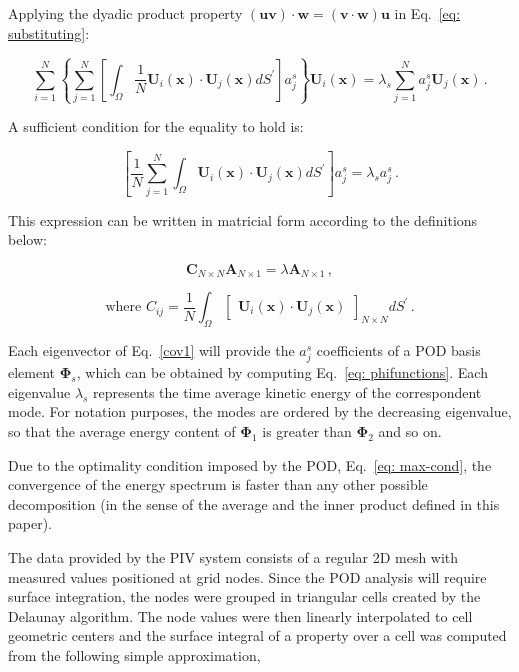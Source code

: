 \documentclass[12pt,a4paper]{article}
\newcommand{\bv}[1]{\mathbf{#1}}
\begin{document}
Applying the dyadic product property $(\mathbf{u} \mathbf{v}) \cdot \mathbf{w} =  (\mathbf{v} \cdot \mathbf{w}) \mathbf{u}$ in Eq.~\eqref{eq: substituting}:


\begin{equation*}
\sum_{i=1}^{N} \left \lbrace \sum_{j=1}^{N} \left[\int_{\Omega} \frac{1}{N} \bv{U}_i(\bv{x}) \cdot \bv{U}_{j} (\bv{x}) dS^{\prime}  \right] a^{s}_{j} \right \rbrace \bv{U}_i(\bv{x}) = \lambda_{s} \sum_{j=1}^{N} a^{s}_{j} \bv{U}_{j} (\bv{x}) \,.
\end{equation*}


A sufficient condition for the equality to hold is:


\begin{equation}
\left[\frac{1}{N} \sum_{j=1}^{N} \int_{\Omega} \bv{U}_{i}(\bv{x}) \cdot \bv{U}_{j}(\bv{x}) dS^{\prime} \right] a^{s}_{j}= \lambda_{s} a^{s}_{j} \,.
\end{equation}


This expression can be written in matricial form according to the definitions below:


\begin{equation} \label{cov1}
\bv{C}_{N \times N} \bv{A}_{N \times 1} = \lambda \bv{A}_{N \times 1} \,,
\end{equation}


\begin{equation*}
\text{where} \, \, C_{ij}= \frac{1}{N}  \int_{\Omega} \begin{bmatrix}  \bv{U}_i(\bv{x}) \cdot \bv{U}_{j} (\bv{x})  \end{bmatrix}_{N \times N} dS^{\prime} \,.
\end{equation*}


Each eigenvector of Eq.~\eqref{cov1} will provide the $a^{s}_{j}$ coefficients of a POD basis element $\bv{\Phi}_s$, which can be obtained by computing Eq.~\eqref{eq: phifunctions}. Each eigenvalue $\lambda_s$ represents the time average kinetic energy of the correspondent mode. For notation purposes, the modes are ordered by the decreasing eigenvalue, so that the average energy content of $\bv{\Phi}_1$ is greater than $\bv{\Phi}_2$ and so on.

Due to the optimality condition imposed by the POD, Eq.~\eqref{eq: max-cond}, the convergence of the energy spectrum is faster than any other possible decomposition (in the sense of the average and the inner product defined in this paper).

The data provided by the PIV system consists of a regular 2D mesh with measured values positioned at grid nodes. Since the POD analysis will require surface integration, the nodes were grouped in triangular cells created by the Delaunay algorithm. The node values were then linearly interpolated to cell geometric centers and the surface integral of a property over a cell was computed from the following simple approximation,
\end{document}
